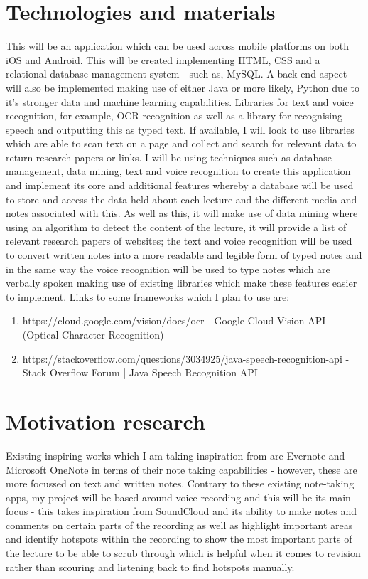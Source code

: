 \documentclass{report}
\begin{document}
\section{Technologies and materials}
	This will be an application which can be used across mobile platforms on both iOS and Android. This will be created implementing HTML, CSS and a relational database management system - such as, MySQL. A back-end aspect will also be implemented making use of either Java or more likely, Python due to it's stronger data and machine learning capabilities.
	Libraries for text and voice recognition, for example, OCR recognition as well as a library for recognising speech and outputting this as typed text. If available, I will look to use libraries which are able to scan text on a page and collect and search for relevant data to return research papers or links.
	I will be using techniques such as database management, data mining, text and voice recognition to create this application and implement its core and additional features whereby a database will be used to store and access the data held about each lecture and the different media and notes associated with this. As well as this, it will make use of data mining where using an algorithm to detect the content of the lecture, it will provide a list of relevant research papers of websites; the text and voice recognition will be used to convert written notes into a more readable and legible form of typed notes and in the same way the voice recognition will be used to type notes which are verbally spoken making use of existing libraries which make these features easier to implement.
	Links to some frameworks which I plan to use are:
	\begin{enumerate}
		\item https://cloud.google.com/vision/docs/ocr - Google Cloud Vision API (Optical Character Recognition)
		\item https://stackoverflow.com/questions/3034925/java-speech-recognition-api - Stack Overflow Forum | Java Speech Recognition API
	\end{enumerate}

\section{Motivation research}
	Existing inspiring works which I am taking inspiration from are Evernote and Microsoft OneNote in terms of their note taking capabilities - however, these are more focussed on text and written notes. Contrary to these existing note-taking apps, my project will be based around voice recording and this will be its main focus - this takes inspiration from SoundCloud and its ability to make notes and comments on certain parts of the recording as well as highlight important areas and identify hotspots within the recording to show the most important parts of the lecture to be able to scrub through which is helpful when it comes to revision rather than scouring and listening back to find hotspots manually.
\end{document}
